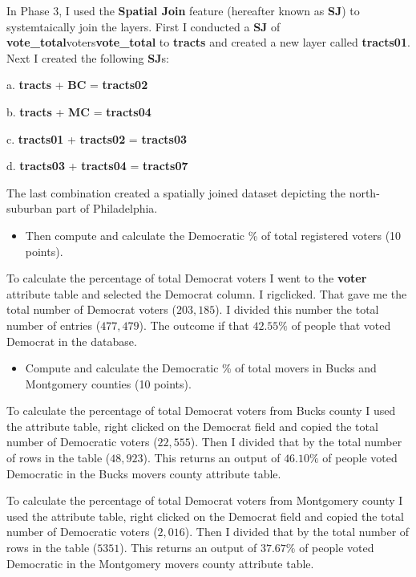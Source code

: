\documentclass[12pt]{article}
\begin{document}
In Phase 3, I used the \textbf{Spatial Join} feature (hereafter known as \textbf{SJ}) to systemtaically join the layers.  First I conducted a \textbf{SJ} of \textbf{vote\_total}voters\textbf{vote\_total} to \textbf{tracts} and created a new layer called \textbf{tracts01}.  Next I created the following \textbf{SJ}s: 

a.  \textbf{tracts} + \textbf{BC} = \textbf{tracts02} 

b.  \textbf{tracts} + \textbf{MC} = \textbf{tracts04} 

c.  \textbf{tracts01} + \textbf{tracts02} = \textbf{tracts03}

d.  \textbf{tracts03} + \textbf{tracts04} = \textbf{tracts07}

The last combination created a spatially joined dataset depicting the north-suburban part of Philadelphia.

\begin{itemize}
	\item Then compute and calculate the Democratic \% of total registered voters (10 points).
\end{itemize}

To calculate the percentage of total Democrat voters I went to the \textbf{voter} attribute table and selected the Democrat column.  I rigclicked.  That gave me the total number of Democrat voters ($203,185$).  I divided this number the total number of entries ($477,479$).  The outcome if that $42.55\%$ of people that voted Democrat in the database.

\begin{itemize}
	\item Compute and calculate the Democratic \% of total movers in Bucks and Montgomery counties (10 points).
\end{itemize}

To calculate the percentage of total Democrat voters from Bucks county I used the attribute table, right clicked on the Democrat field and copied the total number of Democratic voters ($22,555$).  Then I divided that by the total number of rows in the table ($48,923$).  This returns an output of $46.10\%$ of people voted Democratic in the Bucks movers county attribute table.

To calculate the percentage of total Democrat voters from Montgomery county I used the attribute table, right clicked on the Democrat field and copied the total number of Democratic voters ($2,016$).  Then I divided that by the total number of rows in the table ($5351$).  This returns an output of $37.67\%$ of people voted Democratic in the Montgomery movers county attribute table.
\end{document}
